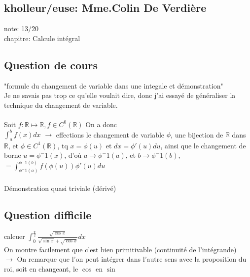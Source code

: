 \documentclass{article}
\begin{document}
\subsection{kholleur/euse: Mme.Colin De Verdière}

note: 13/20 \\
chapitre: Calcule intégral

\subsection{Question de cours}

"formule du changement de variable dans une integale et démonstration" \\
Je ne savais pas trop ce qu'elle voulait dire, donc j'ai essayé de généraliser la technique du changement de variable. \\ \\

Soit $f: \mathbb{R} \mapsto \mathbb{R}, f \in C^0(\mathbb{R})$ On a donc \\
$\int_a^b f(x) dx$ \hspace{1cm} $\rightarrow$ \hspace{0.2cm} effections le changement de variable $\phi$, une bijection de $\mathbb{R}$ dans $\mathbb{R}$, et $\phi \in C^1(\mathbb{R})$, tq $x = \phi(u)$ et $dx = \phi'(u)du$, ainsi que le changement de borne $u = \phi^-1(x)$, d'où $a \rightarrow \phi^-1(a)$, et $b \rightarrow \phi^-1(b)$,\\
$=\int_{\phi^-1(a)}^{\phi^-1(b)} f(\phi(u)) \phi'(u) du$ \\ \\

Démonstration quasi triviale (dérivé)
\subsection{Question difficile}

calcuer $\int_0^{\frac{\pi}{2}} \frac{\sqrt{\cos x}}{\sqrt{\sin x} + \sqrt{\cos x}} dx$ \\

On montre facilement que c'est bien primitivable (continuité de  l'intégrande) \\

\hspace{1cm} $\rightarrow$ On remarque que l'on peut intégrer dans l'autre sens avec la proposition du roi, soit en changeant, le $\cos$ en $\sin$ \\
\end{document}
